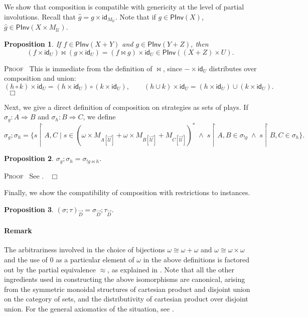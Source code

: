\documentclass[a4paper,11pt]{article}
\newcommand{\gequiv}{\approx}
\newcommand{\UU}{\mathcal{U}}
\newtheorem{proposition}{Proposition}[section]
\newcommand{\restrict}{{\upharpoonright}}
\newcommand{\PInv}[1]{\mathsf{PInv}(#1)}
\newcommand{\invcomp}{\bowtie}
\newcommand{\ident}{\mathsf{id}}
\newenvironment{proof}{\textsc{Proof}\ }{$\;\; \Box$}
\begin{document}
We show that composition is compatible with genericity at the level of
partial involutions. Recall that $\hat{g} = g \times
\ident_{M_{\UU}}$. Note that if $g \in \PInv{X}$, $\hat{g} \in \PInv{X
  \times M_{\UU}}$.
\begin{proposition}
If $f \in \PInv{X+Y}$ and $g \in \PInv{Y+Z}$, then
\[ (f \times \ident_U) \invcomp (g \times \ident_U) = (f \invcomp g)
\times \ident_U \in \PInv{(X + Z) \times U}. \]
\end{proposition}
\begin{proof}
This is immediate from the definition of $\invcomp$, since $-{\times}
\ident_U$ distributes over composition and union:
\[ (h \circ k) \times \ident_U = (h \times \ident_U ) \circ (k \times
\ident_U), \qquad (h \cup k) \times \ident_U = (h \times \ident_U ) \cup (k \times
\ident_U) . \]
\end{proof}

Next, we give a direct definition of composition on strategies as sets
of plays.
If $\sigma_g : A \Rightarrow B$ and $\sigma_h : B \Rightarrow C$, we
define
\[ \sigma_g ; \sigma_h = \{ s \restrict A,C \mid s \in (\omega \times
M_{A[\vec{\UU}]} + \omega \times
M_{B[\vec{\UU}]} + M_{C[\vec{\UU}]})^{\ast} \; \wedge \; s
\restrict A,B \in \sigma_{!g} \; \wedge \; s \restrict B,C \in
\sigma_h \} . \]

\begin{proposition}
$\sigma_g ; \sigma_h = \sigma_{!g \invcomp h}$.
\end{proposition}
\begin{proof}
See \cite{AJ94a}.
\end{proof}

\noindent Finally, we show the compatibility of composition with
restrictions to instances.
\begin{proposition}
$(\sigma ; \tau)_{\vec{D}} = \sigma_{\vec{D}} ; \tau_{\vec{D}}$.
\end{proposition}

\paragraph{Remark} The arbitrariness involved in the choice of
bijections $\omega \cong \omega + \omega$ and $\omega \cong \omega
\times \omega$ and the use of $0$ as  a particular element of $\omega$
in the above definitions is factored out by the partial equivalence
$\gequiv$, as explained in \cite{AJM00}.
Note that all the other ingredients used in constructing the above
isomorphisms are canonical, arising from the symmetric monoidal
structures of cartesian product and disjoint union on the category of sets, and the
distributivity of cartesian product over disjoint union. For the
general axiomatics of the situation, see \cite{AHS02}.
\end{document}
